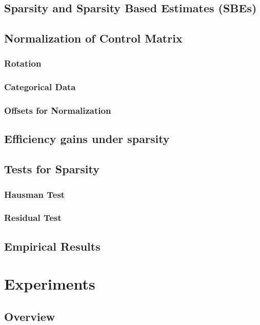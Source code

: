 \subsection{Sparsity and Sparsity Based Estimates (SBEs)}

\subsection{Normalization of Control Matrix}

\subsubsection{Rotation}

\subsubsection{Categorical Data}

\subsubsection{Offsets for Normalization}

\subsection{Efficiency gains under sparsity}


\subsection{Tests for Sparsity}

\subsubsection{Hausman Test}

\subsubsection{Residual Test}


\subsection{Empirical Results}


\section{Experiments}

\subsection{Overview}

